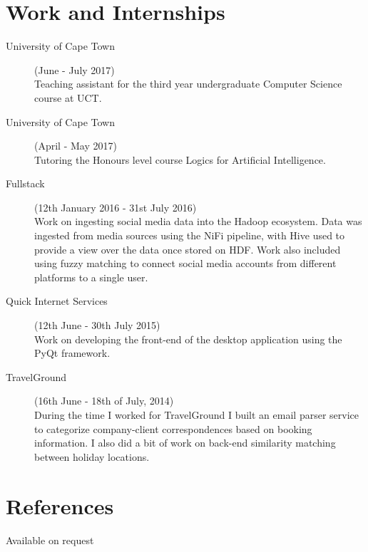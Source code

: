 \documentclass[margin,line,a4paper]{resume}
\begin{document}
\begin{resume}
        \section{\mysidestyle Work and Internships}
            \begin{description}
            	\item[University of Cape Town] (June - July 2017) \\
            		Teaching assistant for the third year undergraduate Computer Science course at UCT.

            	\item[University of Cape Town] (April - May 2017) \\
            		Tutoring the Honours level course Logics for Artificial Intelligence.

                \item[Fullstack] (12th January 2016 - 31st July 2016) \\
                    Work on ingesting social media data into the Hadoop ecosystem. Data was ingested from media sources using the NiFi pipeline, with Hive used to provide a view over the data once stored on HDF. Work also included using fuzzy matching to connect social media accounts from different platforms to a single user.

                \item[Quick Internet Services] (12th June - 30th July 2015) \\
                    Work on developing the front-end of the desktop application using the PyQt framework.

                \item[TravelGround] (16th June - 18th of July, 2014) \\
                    During the time I worked for TravelGround I built an email parser service to categorize company-client correspondences based on booking information. I also did a bit of work on back-end similarity matching between holiday locations.

            \end{description}

       	\section{\mysidestyle References}
            Available on request
    \end{resume}
\end{document}
